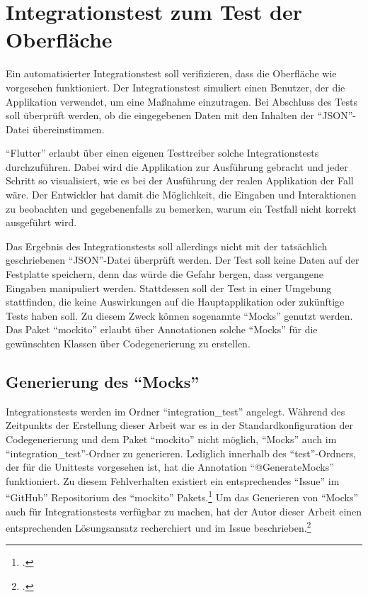 \ifodd\value{page}\hbox{}\newpage\fi
\section{Integrationstest zum Test der Oberfläche}
\label{sec:Integrations}

Ein automatisierter Integrationstest soll verifizieren, dass die Oberfläche wie vorgesehen funktioniert.
Der Integrationstest simuliert einen Benutzer, der die Applikation verwendet, um eine Maßnahme einzutragen.
Bei Abschluss des Tests soll überprüft werden, ob die  eingegebenen Daten mit den Inhalten der \enquote{JSON}-Datei übereinstimmen.

\enquote{Flutter} erlaubt über einen eigenen Testtreiber solche Integrationstests durchzuführen.
Dabei wird die Applikation zur Ausführung gebracht und jeder Schritt so visualisiert, wie es bei der Ausführung der realen Applikation der Fall wäre.
Der Entwickler hat damit die Möglichkeit, die Eingaben und Interaktionen zu beobachten und gegebenenfalls zu bemerken, warum ein Testfall nicht korrekt ausgeführt wird.

Das Ergebnis des Integrationstests soll allerdings nicht mit der tatsächlich geschriebenen \enquote{JSON}-Datei überprüft werden.
Der Test soll keine Daten auf der Festplatte speichern,
denn das würde die Gefahr bergen, dass vergangene Eingaben manipuliert werden.
Stattdessen soll der Test in einer Umgebung stattfinden, die keine Auswirkungen auf die Hauptapplikation oder zukünftige Tests haben soll.
Zu diesem Zweck können sogenannte \enquote{Mocks} genutzt werden.
Das Paket \enquote{mockito} erlaubt über Annotationen solche \enquote{Mocks} für die gewünschten Klassen  über Codegenerierung zu erstellen.

\subsection{Generierung des \enquote{Mocks}}
\label{sec:GenerierungDesMocks}

Integrationstests werden im Ordner \enquote{integration_test} angelegt.
Während des Zeitpunkts der Erstellung dieser Arbeit war es in der Standardkonfiguration der Codegenerierung und dem Paket \enquote{mockito} nicht möglich, \enquote{Mocks} auch im \enquote{integration_test}-Ordner zu generieren.
Lediglich innerhalb des \enquote{test}-Ordners, der für die Unittests vorgesehen ist, hat die Annotation \enquote{@GenerateMocks} funktioniert.
Zu diesem Fehlverhalten existiert ein entsprechendes \enquote{Issue} im \enquote{GitHub} Repositorium  des \enquote{mockito} Pakets.\footcite[Vgl.][]{MocksAreNotGeneratedNotInTestFolder}
Um das Generieren von \enquote{Mocks} auch für Integrationstests verfügbar zu machen,
hat der Autor dieser Arbeit einen entsprechenden Lösungsansatz recherchiert und im Issue beschrieben.\footcite[Vgl.][]{MocksAreNotGeneratedNotInTestFolderAntwort}

